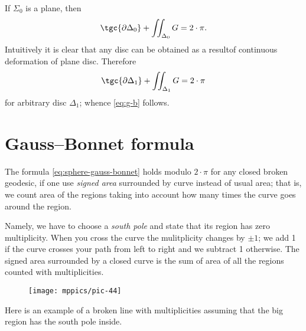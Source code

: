 If $\Sigma_0$ is a plane, then 
\[\tgc{\partial\Delta_0}+\iint_{\Delta_0} G=2\cdot \pi.\]
Intuitively it is clear that any disc can be obtained as a resultof continuous deformation of plane disc.
Therefore 
\[\tgc{\partial\Delta_1}+\iint_{\Delta_1} G=2\cdot \pi\]
for arbitrary disc $\Delta_1$; whence \ref{eq:g-b} follows.
\qeds






































\chapter{Gauss--Bonnet formula}







The formula \ref{eq:sphere-gauss-bonnet} holds modulo $2\cdot \pi$ for any closed broken geodesic, if one use \emph{signed area} surrounded by curve instead of usual area;
that is, we count area of the regions taking into account how many times the curve goes around the region.

Namely, we have to choose a {}\emph{south pole} and state that its region has zero multiplicity.
When you cross the curve the mulitplicity changes by $\pm1$; we add 1 if the curve crosses your path from left to right and we subtract 1 otherwise.
The signed area surrounded by a closed curve is the sum of area of all the regions counted with multiplicities.

\begin{wrapfigure}{o}{32 mm}
\vskip-0mm
\centering
\texttt{[image: mppics/pic-44]}
\vskip-0mm
\end{wrapfigure}

Here is an example of a broken line with multiplicities assuming that the big region has the south pole inside.


